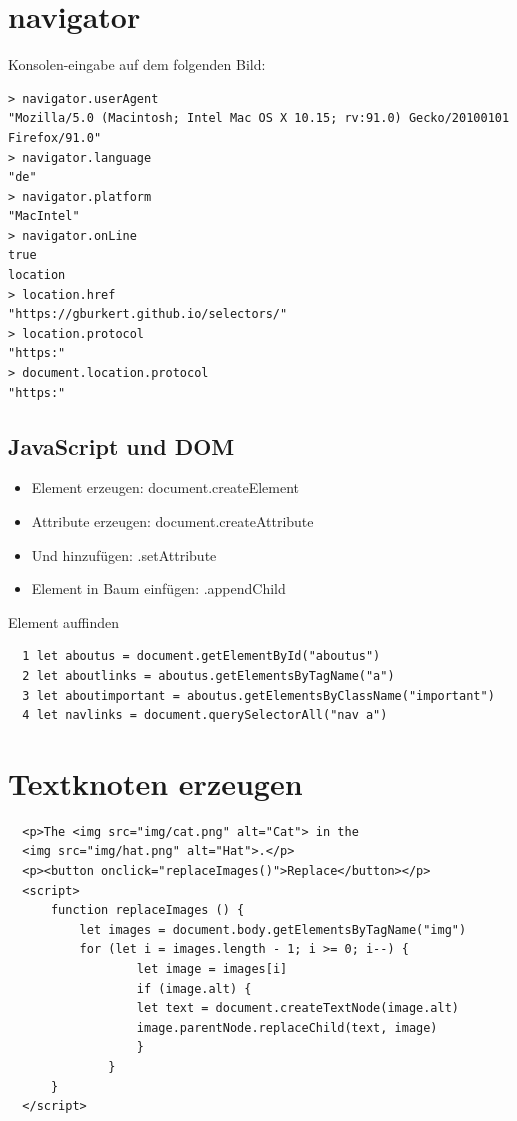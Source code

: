 \section*{navigator}
Konsolen-eingabe auf dem folgenden Bild:

\begin{verbatim}
> navigator.userAgent
"Mozilla/5.0 (Macintosh; Intel Mac OS X 10.15; rv:91.0) Gecko/20100101 Firefox/91.0"
> navigator.language
"de"
> navigator.platform
"MacIntel"
> navigator.onLine
true
location
> location.href
"https://gburkert.github.io/selectors/"
> location.protocol
"https:"
> document.location.protocol
"https:"
\end{verbatim}

\subsection{JavaScript und DOM}

\begin{itemize}
    \item Element erzeugen: document.createElement
    \item Attribute erzeugen: document.createAttribute
    \item Und hinzufügen: .setAttribute
    \item Element in Baum einfügen: .appendChild
  \end{itemize}
  
  Element auffinden
  
  \begin{verbatim}
  1 let aboutus = document.getElementById("aboutus")
  2 let aboutlinks = aboutus.getElementsByTagName("a")
  3 let aboutimportant = aboutus.getElementsByClassName("important")
  4 let navlinks = document.querySelectorAll("nav a")
  \end{verbatim}
  
  \section*{Textknoten erzeugen}
  \begin{verbatim}
  <p>The <img src="img/cat.png" alt="Cat"> in the
  <img src="img/hat.png" alt="Hat">.</p>
  <p><button onclick="replaceImages()">Replace</button></p>
  <script>
      function replaceImages () {
          let images = document.body.getElementsByTagName("img")
          for (let i = images.length - 1; i >= 0; i--) {
                  let image = images[i]
                  if (image.alt) {
                  let text = document.createTextNode(image.alt)
                  image.parentNode.replaceChild(text, image)
                  }
              }
      }
  </script>
  \end{verbatim}
  
